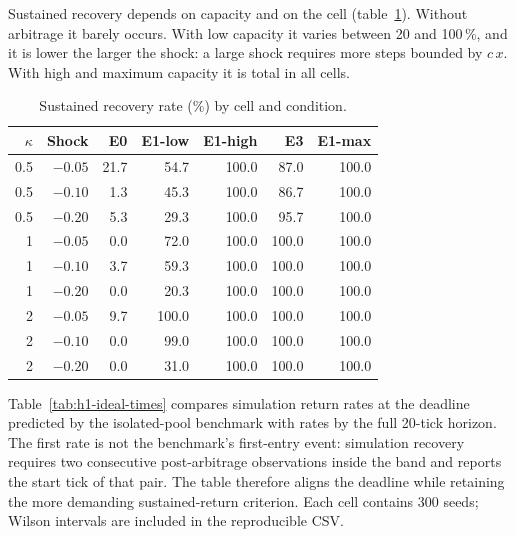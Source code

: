 Sustained recovery depends on capacity and on the cell (table~\ref{tab:recuperacion}). Without arbitrage it barely occurs. With low capacity it varies between 20 and 100\,\%, and it is lower the larger the shock: a large shock requires more steps bounded by $c\,x$. With high and maximum capacity it is total in all cells.

\begin{table}[htbp]
\centering
\caption{Sustained recovery rate (\%) by cell and condition.}
\label{tab:recuperacion}
\small
\begin{tabular}{@{}rrrrrrr@{}}
\toprule
$\kappa$ & Shock & E0 & E1-low & E1-high & E3 & E1-max \\
\midrule
0.5 & $-0.05$ & 21.7 & 54.7 & 100.0 & 87.0 & 100.0 \\
0.5 & $-0.10$ & 1.3 & 45.3 & 100.0 & 86.7 & 100.0 \\
0.5 & $-0.20$ & 5.3 & 29.3 & 100.0 & 95.7 & 100.0 \\
1 & $-0.05$ & 0.0 & 72.0 & 100.0 & 100.0 & 100.0 \\
1 & $-0.10$ & 3.7 & 59.3 & 100.0 & 100.0 & 100.0 \\
1 & $-0.20$ & 0.0 & 20.3 & 100.0 & 100.0 & 100.0 \\
2 & $-0.05$ & 9.7 & 100.0 & 100.0 & 100.0 & 100.0 \\
2 & $-0.10$ & 0.0 & 99.0 & 100.0 & 100.0 & 100.0 \\
2 & $-0.20$ & 0.0 & 31.0 & 100.0 & 100.0 & 100.0 \\
\bottomrule
\end{tabular}
\end{table}

Table~\ref{tab:h1-ideal-times} compares simulation return rates at the deadline predicted by the isolated-pool benchmark with rates by the full 20-tick horizon. The first rate is not the benchmark's first-entry event: simulation recovery requires two consecutive post-arbitrage observations inside the band and reports the start tick of that pair. The table therefore aligns the deadline while retaining the more demanding sustained-return criterion. Each cell contains 300 seeds; Wilson intervals are included in the reproducible CSV.

